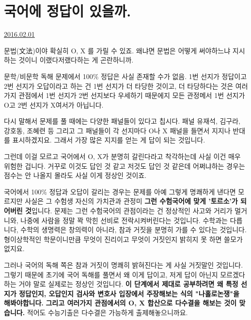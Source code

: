 \section{국어에 정답이 있을까.}
\href{https://www.kockoc.com/Apoc/619599}{2016.02.01}

\vspace{5mm}

문법(文法)이야 확실히 O, X 를 가릴 수 있죠.
왜냐면 문법은 어떻게 써야하느냐 지시하는 것이니 이랬다저랬다하는 게 곤란하니까.
\vspace{5mm}

문학/비문학 독해 문제에서 100$\%$ 정답은 사실 존재할 수가 없음.
1번 선지가 정답이고 2번 선지가 오답이라고 하는 건 1번 선지가 더 타당한 것이고,
더 타당하다는 것은 여러가지 관점에서 1번 선지가 2번 선지보다 우세하기 때문에지
모든 관정메서 1번 선지가 O고 2번 선지가 X여서가 아닙니다.
\vspace{5mm}

다시 말해서 문제를 풀 때에는 다양한 패널들이 있다고 칩시다.
패널 유재석, 김구라, 강호동, 조혜련 등
그리고 그 패널들이 각 선지마다 O나 X 패널을 들면서 지지나 반대를 표시하겠지요.
그래서 가장 많은 지지를 얻는 게 답이 되는 것입니다.
\vspace{5mm}

그런데 이걸 모르고 국어에서 O, X가 분명히 갈린다라고 착각하는데 사실 이건 매우 위험한 겁니다.
거꾸로 이것도 답인 것 같고 저것도 답인 것 같은데 어쩌냐하는 경우는 점수는 안 나올지 몰라도 사실 이게 정상인 것이죠.
\vspace{5mm}

국어에서 100$\%$ 정답과 오답이 갈리는 경우는 문제를 아예 그렇게 명쾌하게 낸다면 모르지만
사실은 그 수험생 자신의 가치관과 관정미 \textbf{그런 수험국어에 맞게 '토르소'가 되어버린 것}입니다.
문제는 그런 수험국어의 관점이라는 건 정상적인 사고와 거리가 멀거니와, 나중에 사람을 정말 꽉 막힌 선비로 전락시켜버린다는 것입니다.
수학과는 다릅니다, 수학의 생명력은 창의력이 아니라, 참과 거짓을 분명히 가를 수 있다는 것입니다.
형이상학적인 학문이니만큼 무엇이 진리이고 무엇이 거짓인지 밝히지 못 하면 쓸모가 없지요.
\vspace{5mm}

그러나 국어의 독해 쪽은 참과 거짓이 명쾌히 밝혀진다는 게 사실 거짓말인 것입니다.
그렇기 때문에 초기에 국어 독해를 풀면서 왜 이게 답이고, 저게 답이 아닌지 모르겠다하는 거야 말로 실제로는 정상인 것입니다.
\textbf{이 단계에서 제대로 공부하려면 왜 특정 선지가 정답인지, 오답인지 검사와 변호사 입장에서 주장해보는 식의 "나홀로논쟁"을 해봐야합니다.}
\textbf{그리고 여러가지 관점에서의 O, X 합산으로 다수결을 해보는 것이 맞습니다.}
적어도 수능기출은 다수결은 가능하게 출제해놓으니까요.
\vspace{5mm}

